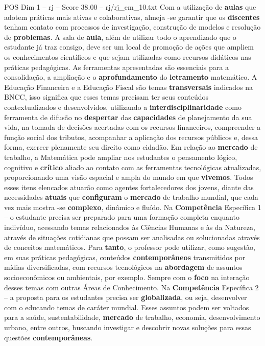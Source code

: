 \begin{textsample}{POS Dim 1 – rj – Score 38.00 – rj/rj\_em\_10.txt}
Com a utilização de \textbf{aulas} que adotem práticas mais ativas e colaborativas, almeja -se garantir que os \textbf{discentes} tenham contato com processos de investigação, construção de modelos e resolução de \textbf{problemas}.
A sala de \textbf{aula}, além de utilizar todo o aprendizado que o estudante já traz consigo, deve ser um local de promoção de ações que ampliem os conhecimentos científicos e que sejam utilizadas como recursos didáticos nas práticas pedagógicas.
As ferramentas apresentadas são essenciais para a consolidação, a ampliação e o \textbf{aprofundamento} do \textbf{letramento} matemático.
A Educação Financeira e a Educação Fiscal são temas \textbf{transversais} indicados na BNCC, isso significa que esses temas precisam ter seus conteúdos contextualizados e desenvolvidos, utilizando a \textbf{interdisciplinaridade} como ferramenta de difusão no \textbf{despertar} das \textbf{capacidades} de planejamento da sua vida, na tomada de decisões acertadas com os recursos financeiros, compreender a função social dos tributos, acompanhar a aplicação dos recursos públicos e, dessa forma, exercer plenamente seu direito como cidadão.
Em relação ao \textbf{mercado} de trabalho, a Matemática pode ampliar nos estudantes o pensamento lógico, cognitivo e \textbf{crítico} aliado ao contato com as ferramentas tecnológicas atualizadas, proporcionando uma visão espacial e ampla do mundo em que \textbf{vivemos}.
Todos esses itens elencados atuarão como agentes fortalecedores dos jovens, diante das necessidades \textbf{atuais} que \textbf{configuram} o \textbf{mercado} de trabalho mundial, que cada vez mais mostra -se \textbf{complexo}, dinâmico e fluído.
Na \textbf{Competência} Específica 1 – o estudante precisa ser preparado para uma formação completa enquanto indivíduo, acessando temas relacionados às Ciências Humanas e às da Natureza, através de situações cotidianas que possam ser analisadas ou solucionadas através de conceitos matemáticos.
Para \textbf{tanto}, o professor pode utilizar, como sugestão, em suas práticas pedagógicas, conteúdos \textbf{contemporâneos} transmitidos por mídias diversificadas, com recursos tecnológicos na \textbf{abordagem} de assuntos socioeconômicos ou ambientais, por exemplo.
Sempre com o \textbf{foco} na interação desses temas com outras Áreas de Conhecimento.
Na \textbf{Competência} Específica 2 – a proposta para os estudantes precisa ser \textbf{globalizada}, ou seja, desenvolver com o educando temas de caráter mundial.
Esses assuntos podem ser voltados para a saúde, sustentabilidade, \textbf{mercado} de trabalho, economia, desenvolvimento urbano, entre outros, buscando investigar e descobrir novas soluções para essas questões \textbf{contemporâneas}.

\end{textsample}
